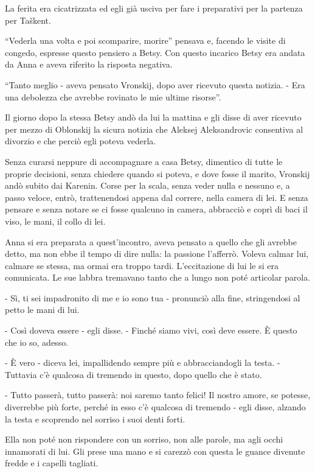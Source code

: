 La ferita era cicatrizzata ed egli già usciva per fare i preparativi per la partenza per Taškent. 

``Vederla una volta e poi scomparire, morire'' pensava e, facendo le visite di congedo, espresse questo pensiero a Betsy. Con questo incarico Betsy era andata da Anna e aveva riferito la risposta negativa. 

``Tanto meglio - aveva pensato Vronskij, dopo aver ricevuto questa notizia. - Era una debolezza che avrebbe rovinato le mie ultime risorse''. 

Il giorno dopo la stessa Betsy andò da lui la mattina e gli disse di aver ricevuto per mezzo di Oblonskij la sicura notizia che Aleksej Aleksandrovic consentiva al divorzio e che perciò egli poteva vederla. 

Senza curarsi neppure di accompagnare a casa Betsy, dimentico di tutte le proprie decisioni, senza chiedere quando si poteva, e dove fosse il marito, Vronskij andò subito dai Karenin. Corse per la scala, senza veder nulla e nessuno e, a passo veloce, entrò, trattenendosi appena dal correre, nella camera di lei. E senza pensare e senza notare se ci fosse qualcuno in camera, abbracciò e coprì di baci il viso, le mani, il collo di lei. 

Anna si era preparata a quest'incontro, aveva pensato a quello che gli avrebbe detto, ma non ebbe il tempo di dire nulla: la passione l'afferrò. Voleva calmar lui, calmare se stessa, ma ormai era troppo tardi. L'eccitazione di lui le si era comunicata. Le sue labbra tremavano tanto che a lungo non poté articolar parola. 

- Sì, ti sei impadronito di me e io sono tua - pronunciò alla fine, stringendosi al petto le mani di lui. 

- Così doveva essere - egli disse. - Finché siamo vivi, così deve essere. È questo che io so, adesso. 

- È vero - diceva lei, impallidendo sempre più e abbracciandogli la testa. - Tuttavia c'è qualcosa di tremendo in questo, dopo quello che è stato. 

- Tutto passerà, tutto passerà: noi saremo tanto felici! Il nostro amore, se potesse, diverrebbe più forte, perché in esso c'è qualcosa di tremendo - egli disse, alzando la testa e scoprendo nel sorriso i suoi denti forti. 

Ella non poté non rispondere con un sorriso, non alle parole, ma agli occhi innamorati di lui. Gli prese una mano e si carezzò con questa le guance divenute fredde e i capelli tagliati. 

